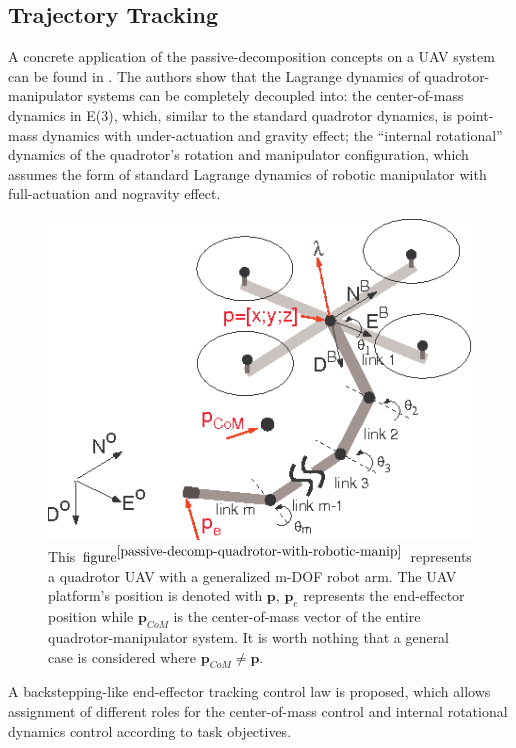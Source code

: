 \subsection{Trajectory Tracking}
A concrete application of the passive-decomposition concepts on a UAV system can be found in \cite{passive-decomp-quadrotor-with-robotic-manip}. The authors show that the Lagrange dynamics of quadrotor-manipulator systems can be completely decoupled into: the center-of-mass dynamics in E(3), which, similar to the standard quadrotor dynamics, is point-mass dynamics with under-actuation  and  gravity  effect; the  “internal rotational” dynamics  of  the  quadrotor’s  rotation  and  manipulator configuration, which assumes the form of standard Lagrange dynamics  of  robotic manipulator with full-actuation and nogravity effect.  
\begin{figure}[H]
	\includegraphics[width=0.95\columnwidth]{figure/aerial_manip.png}	
	\centering
	\caption{This $\text{figure}^{\cite{passive-decomp-quadrotor-with-robotic-manip}}$ represents a quadrotor UAV with a generalized m-DOF robot arm. The UAV platform's position is denoted with $\textbf{p}$, $\textbf{p}_e$ represents the end-effector position while $\textbf{p}_{CoM}$ is the center-of-mass vector of the entire quadrotor-manipulator system. It is worth nothing that a general case is considered where $\textbf{p}_{CoM} \neq\textbf{p}$.  }
	\label{fig:aerial_manip}
\end{figure}
\noindent A backstepping-like end-effector tracking control law is proposed, which allows  assignment of different roles for the center-of-mass control and internal rotational dynamics  control according to task objectives.

